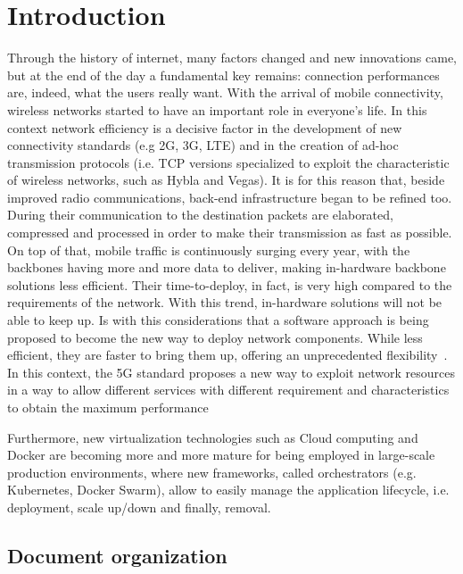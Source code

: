  
\chapter{Introduction}
\label{chap:intro}

Through the history of internet, many factors changed and new innovations came,
but at the end of the day a fundamental key remains: connection performances
are, indeed, what the users really want. With the arrival of mobile
connectivity, wireless networks started to have an important role in everyone's
life. In this context network efficiency is a decisive factor in the development
of new connectivity standards (e.g 2G, 3G, LTE) and in the creation of ad-hoc
transmission protocols (i.e. TCP versions specialized to exploit the
characteristic of wireless networks, such as Hybla and Vegas). It is for this
reason that, beside improved radio communications, back-end infrastructure began
to be refined too. During their communication to the destination packets are
elaborated, compressed and processed in order to make their transmission as fast
as possible. On top of that, mobile traffic is continuously surging every year,
with the backbones having more and more data to deliver, making in-hardware
backbone solutions less efficient. Their time-to-deploy, in fact, is very high
compared to the requirements of the network. With this trend, in-hardware
solutions will not be able to keep up. Is with this considerations that a
software approach is being proposed to become the new way to deploy network
components. While less efficient, they are faster to bring them up, offering an
unprecedented flexibility~\cite{nguyen2017sdn}. In this context, the 5G standard
proposes a new way to exploit network resources in a way to allow different
services with different requirement and characteristics to obtain the maximum
performance 
 
Furthermore, new virtualization technologies such as Cloud computing and Docker
are becoming more and more mature for being employed in large-scale production
environments, where new frameworks, called orchestrators (e.g. Kubernetes,
Docker Swarm), allow to easily manage the application lifecycle, i.e.
deployment, scale up/down and finally, removal.

\newpage
 
\section*{Document organization}
 
